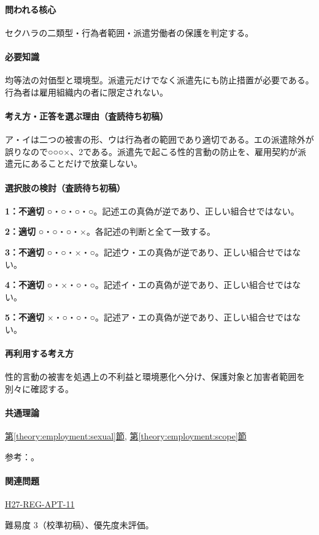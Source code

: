 \paragraph{問われる核心} セクハラの二類型・行為者範囲・派遣労働者の保護を判定する。

\paragraph{必要知識} 均等法の対価型と環境型。派遣元だけでなく派遣先にも防止措置が必要である。行為者は雇用組織内の者に限定されない。

\paragraph{考え方・正答を選ぶ理由（査読待ち初稿）} ア・イは二つの被害の形、ウは行為者の範囲であり適切である。エの派遣除外が誤りなので○○○×、2である。派遣先で起こる性的言動の防止を、雇用契約が派遣元にあることだけで放棄しない。

\paragraph{選択肢の検討（査読待ち初稿）}\mbox{}\par

\noindent\textbf{1：不適切} ○・○・○・○。記述エの真偽が逆であり、正しい組合せではない。\par

\noindent\textbf{2：適切} ○・○・○・×。各記述の判断と全て一致する。\par

\noindent\textbf{3：不適切} ○・○・×・○。記述ウ・エの真偽が逆であり、正しい組合せではない。\par

\noindent\textbf{4：不適切} ○・×・○・○。記述イ・エの真偽が逆であり、正しい組合せではない。\par

\noindent\textbf{5：不適切} ×・○・○・○。記述ア・エの真偽が逆であり、正しい組合せではない。\par

\paragraph{再利用する考え方} 性的言動の被害を処遇上の不利益と環境悪化へ分け、保護対象と加害者範囲を別々に確認する。

\paragraph{共通理論} \hyperref[theory:employment:sexual]{第\ref*{theory:employment:sexual}節}, \hyperref[theory:employment:scope]{第\ref*{theory:employment:scope}節}

\par 参考：\cite{employment_sexual_current,employment_sexual2018,employment_sexual2006}。

\paragraph{関連問題} \hyperref[q:h27-reg-apt-11]{H27-REG-APT-11}

\par 難易度 3（校準初稿）、優先度未評価。
